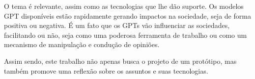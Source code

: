 \documentclass[10pt, conference, compsocconf]{IEEEtran}
\begin{document}
O tema é relevante, assim como as tecnologias que lhe dão suporte. Os modelos GPT disponíveis estão rapidamente gerando impactos na sociedade, seja de forma positiva ou negativa. É um fato que os GPTs vão influenciar as sociedades, facilitando ou não, seja como uma poderosa ferramenta de trabalho ou como um mecanismo de manipulação e condução de opiniões.

Assim sendo, este trabalho não apenas busca o projeto de um protótipo, mas também promove uma reflexão sobre os assuntos e suas tecnologias.


\printbibliography
\end{document}
